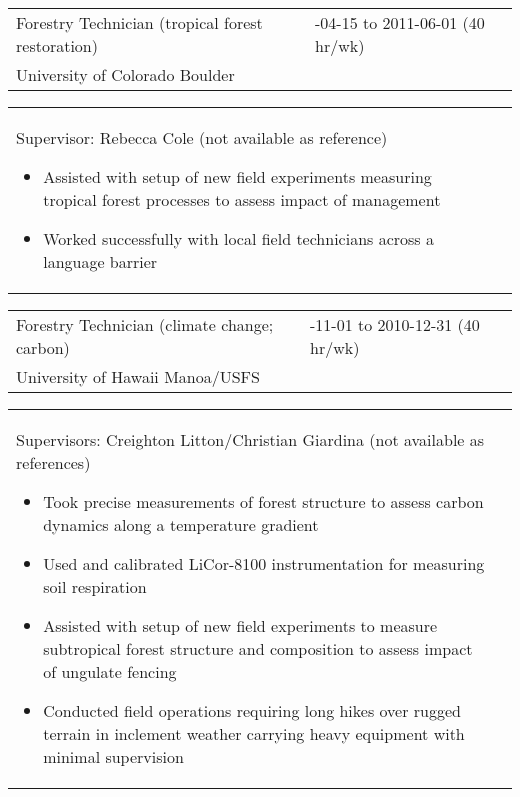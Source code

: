 \documentclass[10pt,english]{article}
\providecommand{\tabularnewline}{\\}
\begin{document}
\renewcommand{\arraystretch}{1.2}
\begin{tabularx}{\textwidth}{@{}>{\raggedright}p{3.75in} >{\raggedleft}X@{}}
Forestry Technician (tropical forest restoration) & 2011-04-15 to 2011-06-01 (40 hr/wk) \tabularnewline
University of Colorado Boulder & \tabularnewline
\end{tabularx}

\renewcommand{\arraystretch}{1.2}
\begin{tabularx}{\textwidth}{@{}>{\raggedright}p{6.25in} >{\raggedleft}X@{}}
\addtolength{\leftskip}{5ex}Supervisor: Rebecca Cole (not available as reference)
\begin{itemize}
\itemsep0em
\item{Assisted with setup of new field experiments measuring tropical forest processes to assess impact of management}
\item{Worked successfully with local field technicians across a language barrier}
\end{itemize}
\end{tabularx}

\renewcommand{\arraystretch}{1.2}
\begin{tabularx}{\textwidth}{@{}>{\raggedright}p{3.75in} >{\raggedleft}X@{}}
Forestry Technician (climate change; carbon) & 2009-11-01 to 2010-12-31 (40 hr/wk) \tabularnewline
University of Hawaii Manoa/USFS & \tabularnewline
\end{tabularx}

\renewcommand{\arraystretch}{1.2}
\begin{tabularx}{\textwidth}{@{}>{\raggedright}p{6.25in} >{\raggedleft}X@{}}
\addtolength{\leftskip}{5ex}Supervisors: Creighton Litton/Christian Giardina (not available as references)
\begin{itemize}
\itemsep0em
\item{Took precise measurements of forest structure to assess carbon dynamics along a temperature gradient}
\item{Used and calibrated LiCor-8100 instrumentation for measuring soil respiration}
\item{Assisted with setup of new field experiments to measure subtropical forest structure and composition to assess impact of ungulate fencing}
\item{Conducted field operations requiring long hikes over rugged terrain in inclement weather carrying heavy equipment  with minimal supervision}
\end{itemize}
\end{tabularx}
\end{document}
